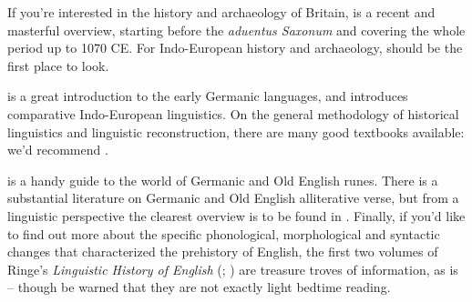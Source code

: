 \begin{furtherreading}
If you're interested in the history and archaeology of Britain, \citet{Fleming2010} is a recent and masterful overview, starting before the \emph{aduentus Saxonum} and covering the whole period up to 1070 CE. For Indo-European history and archaeology, \citet{Anthony2007} should be the first place to look.

\citet{Robinson1992} is a great introduction to the early Germanic languages, and \citet{Clackson2007} introduces comparative Indo-European linguistics. On the general methodology of historical linguistics and linguistic reconstruction, there are many good textbooks available: we'd recommend \citet{Campbell2013}.

\citet{Findell2014} is a handy guide to the world of Germanic and Old English runes. There is a substantial literature on Germanic and Old English alliterative verse, but from a linguistic perspective the clearest overview is to be found in \citet{McCullyHilles2005}. Finally, if you'd like to find out more about the specific phonological, morphological and syntactic changes that characterized the prehistory of English, the first two volumes of Ringe's \emph{Linguistic History of English} (\citealp{Ringe2017}; \citealp{RingeTaylor2014}) are treasure troves of information, as is \citet{Fulk2018} -- though be warned that they are not exactly light bedtime reading.
\end{furtherreading}
